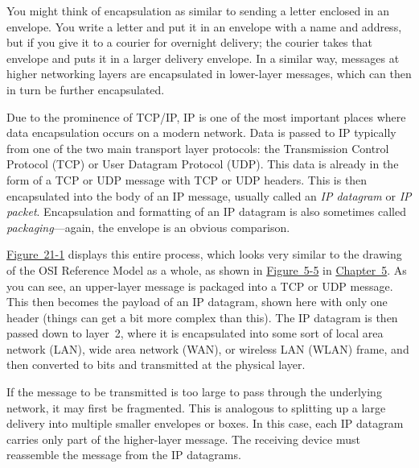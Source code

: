 \documentclass[b5paper,11pt]{memoir}
\begin{document}
You might think of encapsulation as similar to sending a letter enclosed
in an
\protect\hypertarget{ch21.htmlux5cux23idx-CHP-21-0775}{}{}envelope. You
write a letter and put it in an envelope with a name and address, but if
you give it to a courier for overnight delivery; the courier takes that
envelope and puts it in a larger delivery envelope. In a similar way,
messages at higher networking layers are encapsulated in lower-layer
messages, which can then in turn be further encapsulated.

Due to the prominence of TCP/IP, IP is one of the most important places
where data encapsulation occurs on a modern network. Data is passed to
IP typically from one of the two main transport layer protocols: the
Transmission Control Protocol (TCP) or User Datagram Protocol (UDP).
This data is already in the form of a TCP or UDP message with TCP or UDP
headers. This is then encapsulated into the body of an IP message,
usually called an {\emph{IP datagram}} or {\emph{IP packet}}.
Encapsulation and formatting of an IP datagram is also sometimes called
{\emph{packaging}}---again, the envelope is an obvious comparison.

\protect\hyperlink{ch21.htmlux5cux23ip_datagram_encapsulation_the_upper-laye}{Figure~21-1}
displays this entire process, which looks very similar to the drawing of
the OSI Reference Model as a whole, as shown in
\protect\hyperlink{ch05s03.htmlux5cux23osi_reference_model_data_encapsulation_e}{Figure~5-5}
in \protect\hyperlink{ch05.html}{Chapter~5}. As you can see, an
upper-layer message is packaged into a TCP or UDP message. This then
becomes the payload of an IP datagram, shown here with only one header
(things can get a bit more complex than this). The IP datagram is then
passed down to layer~2, where it is encapsulated into some sort of local
area network (LAN), wide area network (WAN), or wireless LAN (WLAN)
frame, and then converted to bits and transmitted at the physical layer.

If the message to be transmitted is too large to pass through the
underlying network, it may first be fragmented. This is analogous to
splitting up a large delivery into multiple smaller envelopes or boxes.
In this case, each IP datagram carries only part of the higher-layer
message. The receiving device must reassemble the message from the IP
datagrams.

\protect\hypertarget{ch21.htmlux5cux23ip_datagram_encapsulation_the_upper-laye}{}{}

\protect\hypertarget{ch21.htmlux5cux23I_mediaobject7_d1e22746}{}{}
\end{document}

